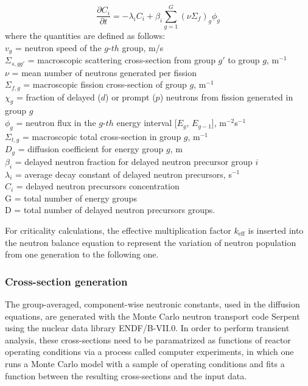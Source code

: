 \documentclass{elsarticle}
\newcommand{\keff}{{\ensuremath{k_{\mathrm{eff}}}} }
\begin{document}
\begin{equation}
    \frac{\partial C_i}{\partial t} = -\lambda_i C_i + \beta_i \sum_{g=1}^G (\nu \Sigma_f)_g \phi_g 
  \label{eq:delayed_neutrons}
\end{equation}
%
where the quantities are defined as follows:
\\
$v_g$ = neutron speed of the $g$-$th$ group, m/s
\\
  $\Sigma_{s, gg'}$ = macroscopic scattering cross-section from group $g'$ to group $g$, m$^{-1}$
\\
  $\nu$ = mean number of neutrons generated per fission
\\
$\Sigma_{f,g}$ = macroscopic fission cross-section of group $g$, m$^{-1}$
\\
  $\chi_g$ = fraction of delayed ($d$) or prompt ($p$) neutrons from fission generated in group $g$ 
\\
  $\phi_{g}$ = neutron flux in the $g$-$th$ energy interval [$E_g$, $E_{g-1}$], m$^{-2}$s$^{-1}$
\\
  $\Sigma_{t,g}$ = macroscopic total cross-section in group $g$, m$^{-1}$
\\
%
  $D_g$ = diffusion coefficient for energy group $g$, m
\\
  $\beta_i$ = delayed neutron fraction for delayed neutron precursor group $i$
\\
  $\lambda_i$ = average decay constant of delayed neutron precursors, s$^{-1}$
\\
  $C_i$ = delayed neutron precursors concentration
 \\
 G = total number of energy groups\\
 D = total number of delayed neutron precursors groups.
  


For criticality calculations, the effective multiplication factor \keff is inserted into the neutron balance equation to represent the variation of neutron population from one generation to the following one.




\subsubsection{Cross-section generation}
The group-averaged, component-wise neutronic constants, used in the diffusion equations, are generated with the Monte Carlo neutron transport code Serpent using the nuclear data library ENDF/B-VII.0. 
In order to perform transient analysis, these cross-sections need to be paramatrized as functions of reactor operating conditions via a process called computer experiments, in which one runs a Monte Carlo model with a sample of operating conditions and fits a function between the resulting cross-sections and the input data.
\end{document}
